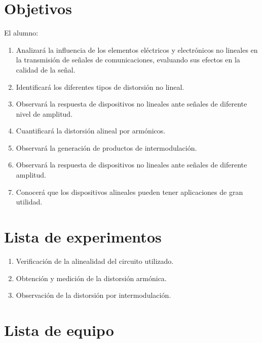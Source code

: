 \documentclass[12pt]{article}
\begin{document}
\tableofcontents
\newpage

\section{Objetivos}

El alumno:

\begin{enumerate}[label=\arabic*.]
    \item Analizará la influencia de los elementos eléctricos y electrónicos no lineales en la transmisión de señales de comunicaciones, evaluando sus efectos en la calidad de la señal.
    \item Identificará los diferentes tipos de distorsión no lineal.
    \item Observará la respuesta de dispositivos no lineales ante señales de diferente nivel de amplitud.
    \item Cuantificará la distorsión alineal por armónicos.
    \item Observará la generación de productos de intermodulación.
    \item Observará la respuesta de dispositivos no lineales ante señales de diferente amplitud.
    \item Conocerá que los dispositivos alineales pueden tener aplicaciones de gran utilidad.
\end{enumerate}

\section{Lista de experimentos}

\begin{enumerate}[label=\arabic*.]
    \item Verificación de la alinealidad del circuito utilizado.
    \item Obtención y medición de la distorsión armónica.
    \item Observación de la distorsión por intermodulación.
\end{enumerate}

\section{Lista de equipo}
\end{document}
